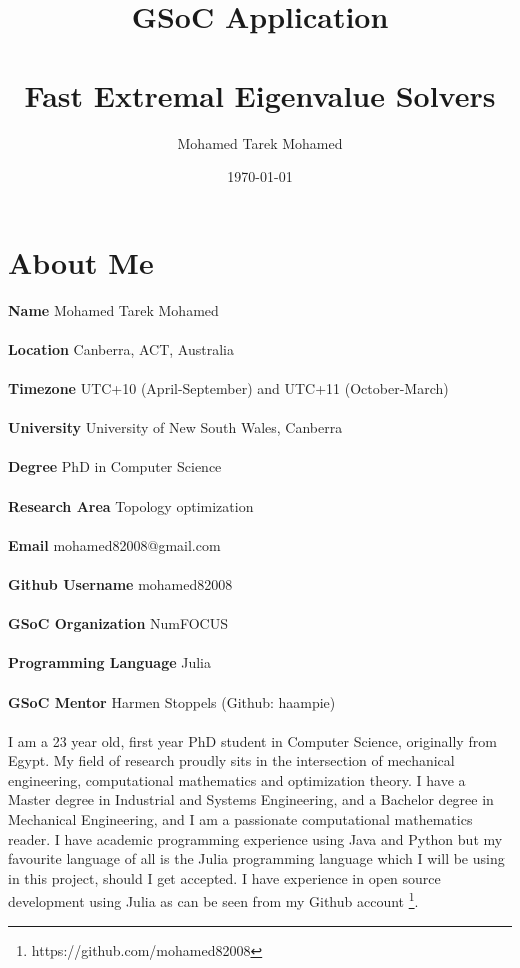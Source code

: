 \documentclass[12pt]{article}
\begin{document}
\begin{titlepage}
\title{
	\textbf{GSoC Application} \\~\\
	Fast Extremal Eigenvalue Solvers\\
}
\author{Mohamed Tarek Mohamed}
\date{\today}
\maketitle
\thispagestyle{empty}
\tableofcontents
\end{titlepage}

\section{About Me}

\textbf{Name} Mohamed Tarek Mohamed \\~\\
\textbf{Location} Canberra, ACT, Australia \\~\\
\textbf{Timezone} UTC+10 (April-September) and UTC+11 (October-March) \\~\\
\textbf{University} University of New South Wales, Canberra \\~\\
\textbf{Degree} PhD in Computer Science \\~\\
\textbf{Research Area} Topology optimization \\~\\
\textbf{Email} mohamed82008@gmail.com \\~\\
\textbf{Github Username} mohamed82008 \\~\\ 
\textbf{GSoC Organization} NumFOCUS \\~\\
\textbf{Programming Language} Julia \\~\\
\textbf{GSoC Mentor} Harmen Stoppels (Github: haampie) \\~\\

I am a 23 year old, first year PhD student in Computer Science, originally from Egypt. My field of research proudly sits in the intersection of mechanical engineering, computational mathematics and optimization theory. I have a Master degree in Industrial and Systems Engineering, and a Bachelor degree in Mechanical Engineering, and I am a passionate computational mathematics reader. I have academic programming experience using Java and Python but my favourite language of all is the Julia programming language which I will be using in this project, should I get accepted. I have experience in open source development using Julia as can be seen from my Github account \footnote{https://github.com/mohamed82008}.
\end{document}

